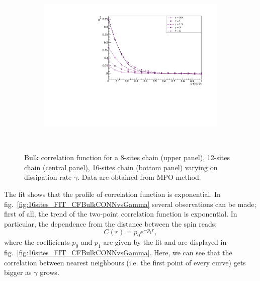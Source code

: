 \begin{figure}[H]
\begin{subfigure}{\columnwidth}
    \includegraphics[scale=0.55]{Figures/16sites/16sites_CFBulkCONNVSgamma.pdf}
    \label{fig:16sites_LMvsGamma}
\end{subfigure}\\
\captionsetup{width=1.\linewidth}
\caption{Bulk correlation function for a 8-sites chain (upper panel), 12-sites chain (central panel), 16-sites chain (bottom panel) varying on dissipation rate $\gamma$. Data are obtained from MPO method.}
\label{fig:BulkCFvsGamma3panelsSizes}
\end{figure}

The fit shows that the profile of correlation function is exponential. In fig.~\ref{fig:16sites_FIT_CFBulkCONNvsGamma} several observations can be made; first of all, the trend of the two-point correlation function is exponential. In particular, the dependence from the distance between the spin reads:
\begin{equation*}
    C(r) = p_0 e^{-p_1 r},
\end{equation*}
where the coefficients $p_0$ and $p_1$ are given by the fit and are displayed in fig.~\ref{fig:16sites_FIT_CFBulkCONNvsGamma}. Here, we can see that the correlation between nearest neighbours (i.e. the first point of every curve) gets bigger as $\gamma$ grows.

